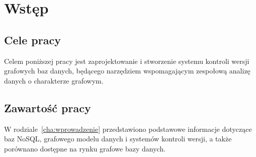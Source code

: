 \chapter{Wstęp}
\label{cha:wstep}



\section{Cele pracy}
\label{sec:celePracy}

Celem poniższej pracy jest zaprojektowanie i stworzenie systemu kontroli wersji grafowych baz danych, będącego narzędziem wspomagającym zespołową analizę danych o charakterze grafowym.



\section{Zawartość pracy}
\label{sec:zawartoscPracy}

W rodziale~\ref{cha:wprowadzenie} przedstawiono podstawowe informacje dotyczące baz NoSQL, grafowego modelu danych i systemów kontroli wersji, a także porównano dostępne na rynku grafowe bazy danych.

















